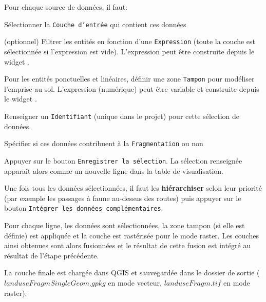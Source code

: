 \documentclass[11pt]{article}
\let\tempone\itemize
\let\temptwo\enditemize
\renewenvironment{enumerate}{\tempone\addtolength{\itemsep}{-0.5\baselineskip}}{\temptwo}
\begin{document}
Pour chaque source de données, il faut:
\begin{enumerate}
    \item Sélectionner la \texttt{Couche d'entrée} qui contient ces données
    \item (optionnel) Filtrer les entités en fonction d'une \texttt{Expression} (toute la couche est sélectionnée si l'expression est vide). L'expression peut être construite depuis le widget .
    \item Pour les entités ponctuelles et linéaires, définir une zone \texttt{Tampon} pour modéliser l'emprise au sol. L'expression (numérique) peut être variable et construite depuis le widget .
    \item Renseigner un \texttt{Identifiant} (unique dans le projet) pour cette sélection de données.
    \item Spécifier si ces données contribuent à la \texttt{Fragmentation} ou non
    \item Appuyer sur le bouton \texttt{Enregistrer la sélection}. La sélection renseignée apparaît alors comme un nouvelle ligne dans la table de visualisation.
\end{enumerate}

Une fois tous les données sélectionnées, il faut les \textbf{hiérarchiser} selon leur priorité (par exemple les passages à faune au-dessus des routes) puis appuyer sur le bouton \texttt{Intégrer les données complémentaires}.

Pour chaque ligne, les données sont sélectionnées, la zone tampon (si elle est définie) est appliquée et la couche est rastérisée pour le mode raster. Les couches ainsi obtenues sont alors fusionnées et le résultat de cette fusion est intégré au résultat de l'étape précédente. 

La couche finale est chargée dans QGIS et sauvegardée dans le dossier de sortie ( $landuseFragmSingleGeom.gpkg$ en mode vecteur, $landuseFragm.tif$ en mode raster).
\end{document}

